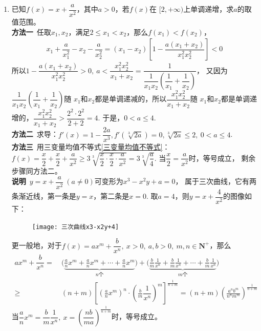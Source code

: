 \begin{enumerate}[label={【\textbf{例\thechapter.\arabic*}】},
 leftmargin=\inteval{\myenumleftmargin}pt,
 itemsep=\inteval{\myenumitempsep}pt,
 itemindent=\inteval{\myenumitemindent}pt]
\item 已知$ f(x)=x+\dfrac{a}{x^2} $，其中$ a>0 $，若$ f(x) $在
$ [2,+\infty) $上单调递增，求$ a $的取值范围。 \\
\textbf{方法一}\ 任取$ x_1,x_2 $，满足$ 2\leq x_1<x_2 $，那么$ f(x_1)<f(x_2) $，
\begin{align*}
    x_1+\dfrac{a}{x_1^2}-x_2-\dfrac{a}{x_2^2} 
    =(x_1-x_2)\left[1-\dfrac{a(x_1+x_2)}{x_1^2x_2^2} \right] <0 
\end{align*} 
所以$ 1-\dfrac{a(x_1+x_2)}{x_1^2x_2^2}>0,\ a<\dfrac{x_1^2x_2^2}{x_1+x_2}=
\dfrac{1}{\dfrac{1}{x_1x_2}\left(\dfrac{1}{x_1}+\dfrac{1}{x_2}\right)} $，
又因为$ \dfrac{1}{x_1x_2}\left(\dfrac{1}{x_1}+\dfrac{1}{x_2}\right) $随
$ x_1 $和$ x_2 $都是单调递减的，所以$ \dfrac{x_1^2x_2^2}{x_1+x_2} $随
$ x_1 $和$ x_2 $都是单调递增的，$ \dfrac{x_1^2x_2^2}{x_1+x_2}>
\dfrac{2^2\cdot 2^2}{2+2}=4 $. 于是，$ 0<a\leq 4 $. \\
\textbf{方法二}\ 求导：$ f'(x)=1-\dfrac{2a}{x^3},f'\left(\sqrt[3]{
    2a} \right)=0,\sqrt[3]{2a}\leq 2,\ 0<a\leq 4 $. \smallskip \\
\textbf{方法三}\ 用三变量均值不等式\eqref{三变量均值不等式}：
$ f(x)=\dfrac{x}{2}+\dfrac{x}{2}+\dfrac{a}{x^2}
\geq 3\sqrt[3]{\dfrac{x}{2}\cdot\dfrac{x}{2}\cdot \dfrac{a}{x^2}}=
3\sqrt[3]{\dfrac{a}{4}} $. 当$ \dfrac{x}{2}=\dfrac{a}{x^2} $时，等号成立，
剩余步骤同方法二。 \\
\textbf{说明}\ $ y=x+\dfrac{a}{x^2}\ (a\neq 0) $可变形为$ x^3-x^2y+a=0 $，
属于三次曲线，它有两条渐近线，第一条是$ y=x $，第二条是$ x=0 $. 
取$ a=4 $，则$ y=x+\dfrac{4}{x^2} $的图像如下：
\begin{figure}[H]
    \centering
    \texttt{[image: 三次曲线x3-x2y+4]}
\end{figure}
更一般地，对于$ f(x)=ax^m+\dfrac{b}{x^n},\ x>0,\ a,b>0,\ m,n\in \textbf{N}^+ $，那么
\begin{align*}
    ax^m+\dfrac{b}{x^n}=&\ \Big(\underbrace{\frac{a}{n}x^m+\frac{a}{n}x^m+\cdots+
        \frac{a}{n}x^m}_{n\text{个}} \Big)+
    \Big(\underbrace{\frac{b}{m}\frac{1}{x^n}+\frac{b}{m}\frac{1}{x^n}
        +\cdots+ \frac{b}{m}\frac{1}{x^n}}_{m\text{个}} \Big)  \\
    \geq &\ (n+m) \left[\left(\frac{a}{n}x^m\right)^n\cdot 
    \left(\frac{b}{m}\dfrac{1}{x^n}\right)^m\right]^{\frac{1}{n+m}} 
    =(n+m) \left(\frac{a^nb^m}{n^nm^m}\right)^{\frac{1}{n+m}}
\end{align*}
当$ \dfrac{a}{n}x^m=\dfrac{b}{m}\dfrac{1}{x^n},\ 
x=\left(\dfrac{nb}{ma}\right)^{\frac{1}{n+m}} $时，等号成立。


\end{enumerate}
